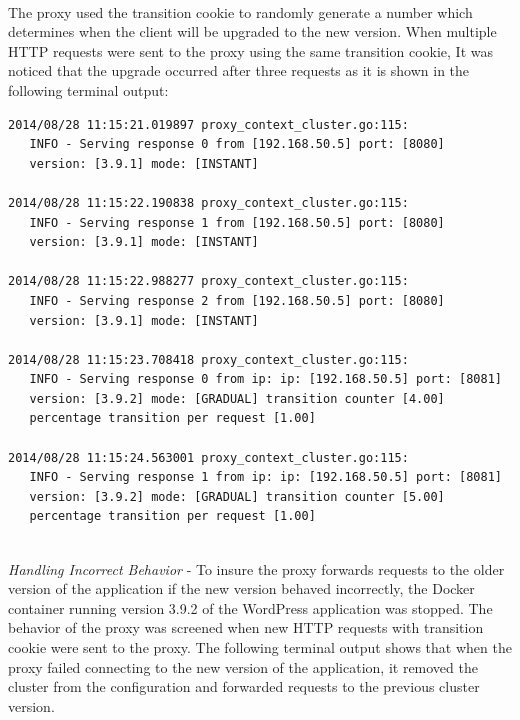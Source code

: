 \documentclass[a4paper,11pt,twoside]{report}
\begin{document}
\noindent\\
The proxy used the transition cookie to randomly generate a number which determines when the client will be upgraded to the new version. When multiple HTTP requests were sent to the proxy using the same transition cookie, It was noticed that the upgrade occurred after three requests as it is shown in the following terminal output: \smallskip

\begin{lstlisting}[language=terminal]
2014/08/28 11:15:21.019897 proxy_context_cluster.go:115:     
   INFO - Serving response 0 from [192.168.50.5] port: [8080] 
   version: [3.9.1] mode: [INSTANT]

2014/08/28 11:15:22.190838 proxy_context_cluster.go:115:     
   INFO - Serving response 1 from [192.168.50.5] port: [8080] 
   version: [3.9.1] mode: [INSTANT]

2014/08/28 11:15:22.988277 proxy_context_cluster.go:115:     
   INFO - Serving response 2 from [192.168.50.5] port: [8080] 
   version: [3.9.1] mode: [INSTANT]

2014/08/28 11:15:23.708418 proxy_context_cluster.go:115:     
   INFO - Serving response 0 from ip: ip: [192.168.50.5] port: [8081] 
   version: [3.9.2] mode: [GRADUAL] transition counter [4.00] 
   percentage transition per request [1.00]
   
2014/08/28 11:15:24.563001 proxy_context_cluster.go:115:     
   INFO - Serving response 1 from ip: ip: [192.168.50.5] port: [8081] 
   version: [3.9.2] mode: [GRADUAL] transition counter [5.00] 
   percentage transition per request [1.00]
\end{lstlisting}

\noindent\\
\textit{Handling Incorrect Behavior} - To insure the proxy forwards requests to the older version of the application if the new version behaved incorrectly, the Docker container running version 3.9.2 of the WordPress application was stopped. The behavior of the proxy was screened when new HTTP requests with transition cookie were sent to the proxy. The following terminal output shows that when the proxy failed connecting to the new version of the application, it removed the cluster from the configuration and forwarded requests to the previous cluster version. \smallskip
\end{document}
